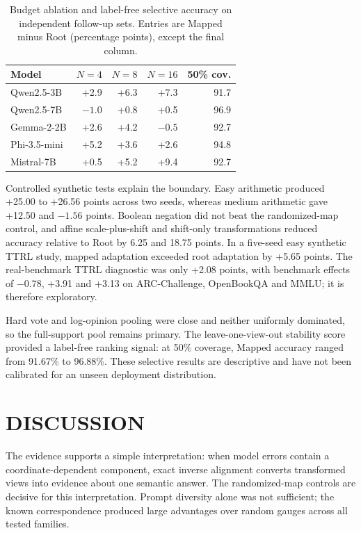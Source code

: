 \documentclass{article}
\begin{document}
\begin{table}[t]
\centering\small\setlength{\tabcolsep}{3pt}
\caption{Budget ablation and label-free selective accuracy on independent follow-up sets. Entries are Mapped minus Root (percentage points), except the final column.}
\label{tab:scaling}
\begin{tabular}{@{}lrrrr@{}}
\toprule
Model & $N=4$ & $N=8$ & $N=16$ & 50\% cov.\\
\midrule
Qwen2.5-3B & +2.9 & +6.3 & +7.3 & 91.7\\
Qwen2.5-7B & $-1.0$ & +0.8 & +0.5 & 96.9\\
Gemma-2-2B & +2.6 & +4.2 & $-0.5$ & 92.7\\
Phi-3.5-mini & +5.2 & +3.6 & +2.6 & 94.8\\
Mistral-7B & +0.5 & +5.2 & +9.4 & 92.7\\
\bottomrule
\end{tabular}
\end{table}

Controlled synthetic tests explain the boundary. Easy arithmetic produced +25.00 to +26.56 points across two seeds, whereas medium arithmetic gave +12.50 and $-1.56$ points. Boolean negation did not beat the randomized-map control, and affine scale-plus-shift and shift-only transformations reduced accuracy relative to Root by 6.25 and 18.75 points. In a five-seed easy synthetic TTRL study, mapped adaptation exceeded root adaptation by +5.65 points. The real-benchmark TTRL diagnostic was only +2.08 points, with benchmark effects of $-0.78$, +3.91 and +3.13 on ARC-Challenge, OpenBookQA and MMLU; it is therefore exploratory.

Hard vote and log-opinion pooling were close and neither uniformly dominated, so the full-support pool remains primary. The leave-one-view-out stability score provided a label-free ranking signal: at 50\% coverage, Mapped accuracy ranged from 91.67\% to 96.88\%. These selective results are descriptive and have not been calibrated for an unseen deployment distribution.

\section{DISCUSSION}
The evidence supports a simple interpretation: when model errors contain a coordinate-dependent component, exact inverse alignment converts transformed views into evidence about one semantic answer. The randomized-map controls are decisive for this interpretation. Prompt diversity alone was not sufficient; the known correspondence produced large advantages over random gauges across all tested families.
\end{document}
